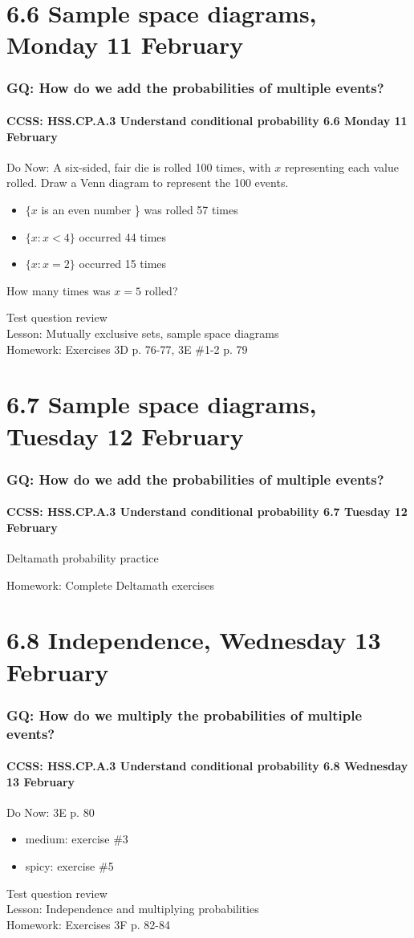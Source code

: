 \documentclass{beamer}
\begin{document}
\section{6.6 Sample space diagrams, Monday 11 February}
  \frame
  {
    \frametitle{GQ: How do we add the probabilities of multiple events?}
    \framesubtitle{CCSS: HSS.CP.A.3 Understand conditional probability \hfill \alert{6.6 Monday 11 February}}

    \begin{block}{Do Now: A six-sided, fair die is rolled 100 times, with $x$ representing each value rolled. Draw a Venn diagram to represent the 100 events.}
      \begin{itemize}
        \item $\{x$ is an even number \} was rolled 57 times
        \item $\{x: x <4\}$ occurred 44 times
        \item $\{x: x =2\}$ occurred 15 times
      \end{itemize}
      How many times was $x=5$ rolled?
    \end{block}
    Test question review\\
    Lesson: Mutually exclusive sets, sample space diagrams\\[0.5cm]
    Homework: Exercises 3D p. 76-77, 3E \#1-2 p. 79
  }

\section{6.7 Sample space diagrams, Tuesday 12 February}
  \frame
  {
    \frametitle{GQ: How do we add the probabilities of multiple events?}
    \framesubtitle{CCSS: HSS.CP.A.3 Understand conditional probability \hfill \alert{6.7 Tuesday 12 February}}

    \begin{block}{Deltamath probability practice}
    \end{block}
    Homework: Complete Deltamath exercises
  }

\section{6.8 Independence, Wednesday 13 February}
  \frame
  {
    \frametitle{GQ: How do we multiply the probabilities of multiple events?}
    \framesubtitle{CCSS: HSS.CP.A.3 Understand conditional probability \hfill \alert{6.8 Wednesday 13 February}}

    \begin{block}{Do Now: 3E p. 80}
      \begin{itemize}
        \item medium: exercise \#3
        \item spicy: exercise \#5
      \end{itemize}
    \end{block}
    Test question review\\
    Lesson: Independence and multiplying probabilities\\[0.5cm]
    Homework: Exercises 3F p. 82-84
  }
\end{document}
